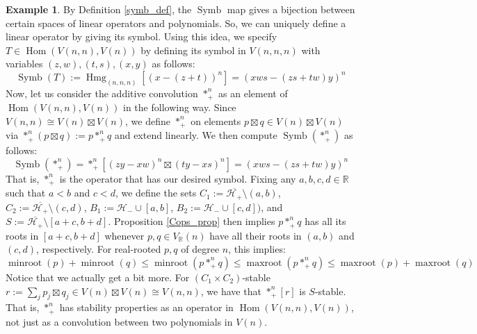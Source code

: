 \documentclass{article}
\theoremstyle{definition}
\newtheorem{example}[theorem]{Example}
\theoremstyle{plain}
\newcommand{\R}{\mathbb{R}}
\newcommand{\UHP}{\mathcal{H}_+}
\newcommand{\LHP}{\mathcal{H}_-}
\DeclareMathOperator{\Hmg}{Hmg}
\DeclareMathOperator{\Symb}{Symb}
\DeclareMathOperator{\Hom}{Hom}
\DeclareMathOperator{\maxroot}{maxroot}
\DeclareMathOperator{\minroot}{minroot}
\begin{document}
\begin{example}
    By Definition \ref{symb_def}, the $\Symb$ map gives a bijection between certain spaces of linear operators and polynomials. So, we can uniquely define a linear operator by giving its symbol. Using this idea, we specify $T \in \Hom(V(n,n), V(n))$ by defining its symbol in $V(n,n,n)$ with variables $(z,w),(t,s),(x,y)$ as follows:
    \[
        \Symb(T) := \Hmg_{(n,n,n)}\left[(x - (z+t))^n\right] = (xws - (zs + tw)y)^n
    \]
    Now, let us consider the additive convolution $*_+^n$ as an element of $\Hom(V(n,n),V(n))$ in the following way. Since $V(n,n) \cong V(n) \boxtimes V(n)$, we define $*_+^n$ on elements $p \boxtimes q \in V(n) \boxtimes V(n)$ via $*_+^n(p \boxtimes q) := p *_+^n q$ and extend linearly. We then compute $\Symb(*_+^n)$ as follows:
    \[
        \Symb(*_+^n) = *_+^n\left[(zy-xw)^n \boxtimes (ty-xs)^n\right] = (xws - (zs + tw)y)^n
    \]
    That is, $*_+^n$ is the operator that has our desired symbol. Fixing any $a,b,c,d \in \R$ such that $a<b$ and $c<d$, we define the sets $C_1 := \overline{\UHP} \setminus (a,b)$, $C_2 := \overline{\UHP} \setminus (c,d)$, $B_1 := \LHP \cup [a,b]$, $B_2 := \LHP \cup [c,d])$, and $S := \overline{\UHP} \setminus [a+c,b+d]$. Proposition \ref{Cops_prop} then implies $p *_+^n q$ has all its roots in $[a+c,b+d]$ whenever $p,q \in V_\R(n)$ have all their roots in $(a,b)$ and $(c,d)$, respectively. For real-rooted $p,q$ of degree $n$, this implies:
    \[
        \minroot(p) + \minroot(q) \leq \minroot(p *_+^n q) \leq \maxroot(p *_+^n q) \leq \maxroot(p) + \maxroot(q)
    \]
    Notice that we actually get a bit more. For $(C_1 \times C_2)$-stable $r := \sum_j p_j \boxtimes q_j \in V(n) \boxtimes V(n) \cong V(n,n)$, we have that $*_+^n[r]$ is $S$-stable. That is, $*_+^n$ has stability properties as an operator in $\Hom(V(n,n),V(n))$, not just as a convolution between two polynomials in $V(n)$.
\end{example}
\end{document}
